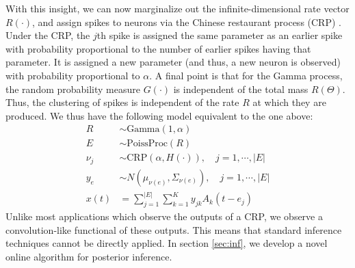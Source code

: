 With this insight, we can now marginalize out the infinite-dimensional rate vector $R(\cdot)$, and assign spikes to neurons via
the Chinese restaurant process (CRP) \citep{Pit2002a}. Under the CRP, the $j$th spike is assigned the same parameter as an earlier spike with probability proportional 
to the number of earlier spikes having that parameter. It is assigned a new parameter (and thus, a new neuron is observed) with probability proportional to
$\alpha$.
A final point is that for the Gamma process, the random probability measure $G(\cdot)$ is independent of the total mass $R(\Theta)$. 
Thus, the clustering of spikes is independent of the rate $R$ at which they are produced. We thus have
 the following model equivalent to the one above:
\begin{align}
  R & \sim \text{Gamma}(1,\alpha) \\
  E &\sim \text{PoissProc}(R) \\
  \nu_j &\sim \text{CRP}(\alpha, H(\cdot)), \quad j = 1,\cdots, |E|   \label{eq:CRP}\\
  y_e &\sim N(\mu_{\nu(e)}, \Sigma_{\nu(e)}), \quad  j = 1,\cdots, |E|   \label{eq:CRP_mix}\\
  x(t) &=   \sum_{j=1}^{|E|} \sum_{k=1}^K y_{jk} A_k(t - e_{j})
\end{align}
Unlike most applications which observe the outputs of a CRP, we observe a convolution-like functional of these outputs. This means that standard
inference techniques cannot be directly applied. In section \ref{sec:inf}, we develop a novel online algorithm for posterior inference.


